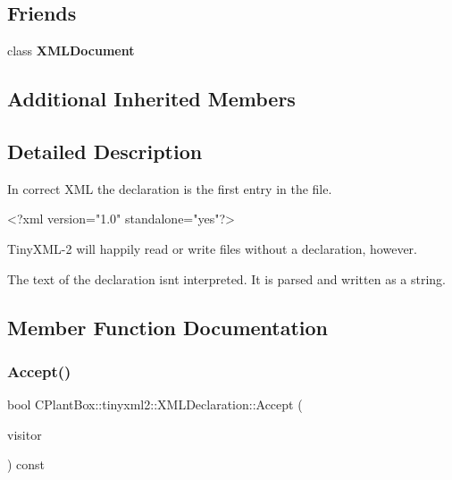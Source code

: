 \subsection*{Friends}
\begin{DoxyCompactItemize}
\item 
\mbox{\label{classCPlantBox_1_1tinyxml2_1_1XMLDeclaration_a4eee3bda60c60a30e4e8cd4ea91c4c6e}} 
class {\bfseries X\+M\+L\+Document}
\end{DoxyCompactItemize}
\subsection*{Additional Inherited Members}


\subsection{Detailed Description}
In correct X\+ML the declaration is the first entry in the file. \begin{DoxyVerb}    <?xml version="1.0" standalone="yes"?>
\end{DoxyVerb}


Tiny\+X\+M\+L-\/2 will happily read or write files without a declaration, however.

The text of the declaration isn\textquotesingle{}t interpreted. It is parsed and written as a string. 

\subsection{Member Function Documentation}
\mbox{\label{classCPlantBox_1_1tinyxml2_1_1XMLDeclaration_abc9e048a89ad5e21f3459c857465dd71}} 
\subsubsection{\texorpdfstring{Accept()}{Accept()}}
{\footnotesize\ttfamily bool C\+Plant\+Box\+::tinyxml2\+::\+X\+M\+L\+Declaration\+::\+Accept (\begin{DoxyParamCaption}\item[{\hyperlink{classCPlantBox_1_1tinyxml2_1_1XMLVisitor}{X\+M\+L\+Visitor} $\ast$}]{visitor }\end{DoxyParamCaption}) const\hspace{0.3cm}{\ttfamily [virtual]}}

